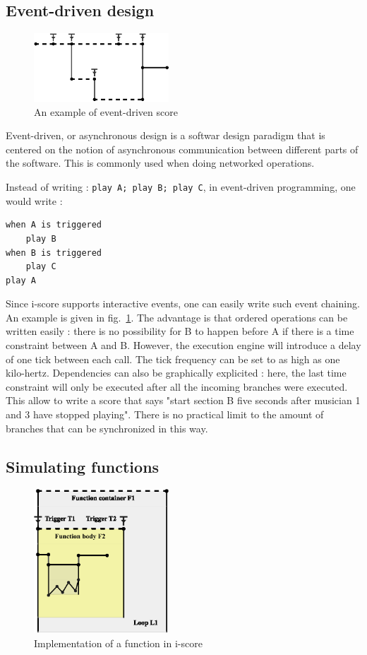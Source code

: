 \documentclass{article}
\begin{document}
\subsection{Event-driven design}
\begin{figure}
    \centering
    \includegraphics[width=0.45\textwidth]{images/event.eps}
    \caption{An example of event-driven score}
    \label{fig.event}
\end{figure}
Event-driven, or asynchronous design is a softwar design 
paradigm that is centered on the notion of asynchronous 
communication between different parts of the software.
This is commonly used when doing networked operations.

Instead of writing : 
\verb|play A; play B; play C|, in event-driven programming, one would write :
\begin{lstlisting}
when A is triggered
    play B
when B is triggered
    play C    
play A
\end{lstlisting}

Since i-score supports interactive events, one can easily write such event chaining.
An example is given in fig.~\ref{fig.event}. 
The advantage is that ordered operations can be written easily : there is no 
possibility for B to happen before A if there is a time constraint between A and B.
However, the execution engine will introduce a delay of one tick between each call.
The tick frequency can be set to as high as one kilo-hertz.
Dependencies can also be graphically explicited : here, the last time constraint will 
only be executed after all the incoming branches were executed. 
This allow to write a score that says "start section B five seconds after musician 1 and 3 
have stopped playing".
There is no practical limit to the amount of branches that can be synchronized in this way.

\subsection{Simulating functions}

\begin{figure}
\centering
\includegraphics[width=0.45\textwidth]{images/function.eps}
\caption{Implementation of a function in i-score}
\label{fig.function}
\end{figure}
\end{document}
